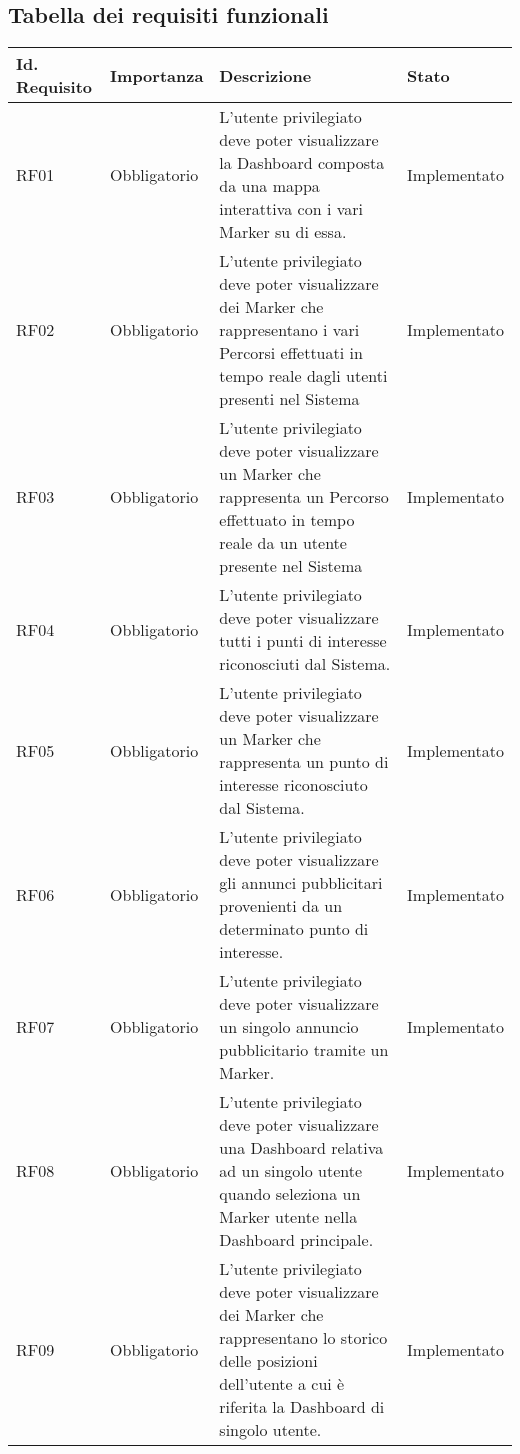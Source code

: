 \documentclass[10pt]{article}
\begin{document}
\subsection{Tabella dei requisiti funzionali}

\begin{longtable}{|>{\centering\arraybackslash}m{2.7cm}|>{\centering\arraybackslash}m{2.7cm}|>{\raggedright\arraybackslash}m{6cm}|>{\centering\arraybackslash}m{2.1cm}|}
    \hline
    \rowcolor{gray!25}
    \textbf{Id. Requisito} & \textbf{Importanza} & \textbf{Descrizione} & \textbf{Stato}\\
    \hline
    RF01 & Obbligatorio & L'utente privilegiato deve poter visualizzare la Dashboard composta da una mappa interattiva con i vari Marker su di essa. & Implementato \\
    \hline
    RF02 & Obbligatorio & L'utente privilegiato deve poter visualizzare dei Marker che rappresentano i vari Percorsi effettuati in tempo reale dagli utenti presenti nel Sistema & Implementato \\
    \hline
    RF03 & Obbligatorio & L'utente privilegiato deve poter visualizzare un Marker che rappresenta un Percorso effettuato in tempo reale da un utente presente nel Sistema & Implementato \\
    \hline
    RF04 & Obbligatorio & L'utente privilegiato deve poter visualizzare tutti i punti di interesse riconosciuti dal Sistema. & Implementato \\
    \hline
    RF05 & Obbligatorio & L'utente privilegiato deve poter visualizzare un Marker che rappresenta un punto di interesse riconosciuto dal Sistema. & Implementato \\
    \hline
    RF06 & Obbligatorio & L'utente privilegiato deve poter visualizzare gli annunci pubblicitari provenienti da un determinato punto di interesse. & Implementato \\
    \hline
    RF07 & Obbligatorio & L'utente privilegiato deve poter visualizzare un singolo annuncio pubblicitario tramite un Marker. & Implementato \\
    \hline
    RF08 & Obbligatorio & L'utente privilegiato deve poter visualizzare una Dashboard relativa ad un singolo utente quando seleziona un Marker utente nella Dashboard principale. & Implementato \\
    \hline
    RF09 & Obbligatorio & L'utente privilegiato deve poter visualizzare dei Marker che rappresentano lo storico delle posizioni dell'utente a cui è riferita la Dashboard di singolo utente. & Implementato \\

\end{longtable}
\end{document}
